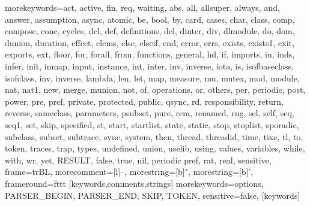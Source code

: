   {morekeywords={act, active, fin, req, waiting, abs, all, allsuper, always, and, answer, 
     assumption, async, atomic, be, bool, by, card, cases, char, class, comp, compose, conc, cycles,
     dcl, def, definitions, del, dinter, div, dlmodule, do, dom, dunion, duration, effect, elems, else, elseif, end,
     error, errs, exists, exists1, exit, exports, ext, floor, for, forall, from, functions, 
     general, hd, if, imports, in, inds, infer, init, inmap, input, instance, int, inter, inv, inverse, iota, is, 
     isofbaseclass, isofclass, inv, inverse, lambda, len, let, map, measure, mu,
     mutex, mod, module, nat, nat1, new, merge, 
     munion, not, of, operations, or, others, per, periodic, post, power, pre, pref, 
     private, protected, public, qsync, rd, responsibility, return, reverse,  
     sameclass, parameters, psubset, pure, rem, renamed, rng, sel, self, seq, seq1, set, skip, specified, st, 
     start, startlist, state, static, stop, stoplist, sporadic, subclass, subset, subtrace, sync, system, then, thread, 
     threadid, time, tixe, tl, to, token, traces, trap, types, undefined,
     union, uselib, using, values, 
     variables, while, with, wr, yet, RESULT, false, true, nil, periodic pref, rat, real},
   sensitive,
   frame=trBL,
   morecomment=[l]--,
   morestring=[b]",
   morestring=[b]',
   frameround=fttt
  }[keywords,comments,strings]
  {morekeywords={options, PARSER\_BEGIN, PARSER\_END, SKIP, TOKEN},
   sensitive=false,
  }[keywords]
